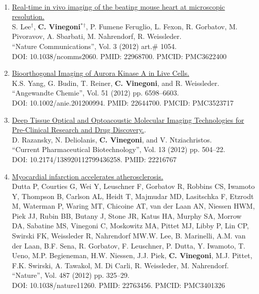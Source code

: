 \documentclass{resume}
\begin{document}
\begin{category}{~~}
\begin{enumerate}
\item
\href{https://tinyurl.com/e98jaep}{Real-time in vivo imaging of the beating mouse heart at microscopic resolution.}\\
S. Lee{$^\dag$}, {\bf C. Vinegoni$^*${$^\dag$}}, P. Fumene Feruglio, L. Fexon, R. Gorbatov, M. Pivoravov, A. Sbarbati, M. Nahrendorf, R. Weissleder.\\
 ``Nature Communications'', Vol. 3 (2012) art.$\#$ 1054. \\DOI: 10.1038/ncomms2060. PMID: 22968700. PMCID: PMC3622400 

\item
\href{https://tinyurl.com/cwd5vabf}{Bioorthogonal Imaging of Aurora Kinase A in Live Cells.}\\
K.S. Yang, G. Budin, T. Reiner, {\bf C. Vinegoni}, and R. Weissleder.\\
 ``Angewandte Chemie'', Vol. 51 (2012) pp. 6598--6603. \\DOI: 10.1002/anie.201200994. PMID: 22644700. PMCID: PMC3523717 

\item
\href{https://tinyurl.com/4cyrytuk}{Deep Tissue Optical and Optoacoustic Molecular Imaging Technologies for Pre-Clinical Research and Drug Discovery.}.\\
 D. Razansky, N. Deliolanis, {\bf C. Vinegoni}, and V. Ntziachristos.\\
 ``Current Pharmaceutical Biotechnology'', Vol. 13 (2012) pp. 504--22. \\DOI: 10.2174/138920112799436258. PMID: 22216767 

\item
\href{https://tinyurl.com/5fm8vmw9}{Myocardial infarction accelerates atherosclerosis.}\\
Dutta P, Courties G, Wei Y, Leuschner F, Gorbatov R, Robbins CS, Iwamoto Y, Thompson B, Carlson AL, Heidt T, Majmudar MD, Lasitschka F, Etzrodt M, Waterman P, Waring MT, Chicoine AT, van der Laan AN, Niessen HWM, Piek JJ, Rubin BB, Butany J, Stone JR, Katus HA, Murphy SA, Morrow DA, Sabatine MS, Vinegoni C, Moskowitz MA, Pittet MJ, Libby P, Lin CP, Swirski FK, Weissleder R, Nahrendorf MW.W. Lee, B. Marinelli, A.M. van der Laan, B.F. Sena, R. Gorbatov, F. Leuschner, P. Dutta, Y. Iwamoto, T. Ueno, M.P. Begieneman, H.W. Niessen, J.J. Piek, {\bf C. Vinegoni}, M.J. Pittet, F.K. Swirski, A. Tawakol, M. Di Carli, R. Weissleder, M. Nahrendorf.\\
 ``Nature'', Vol. 487 (2012) pp. 325--29. \\DOI: 10.1038/nature11260. PMID: 22763456. PMCID: PMC3401326 


\end{enumerate}
\end{category}
\end{document}
